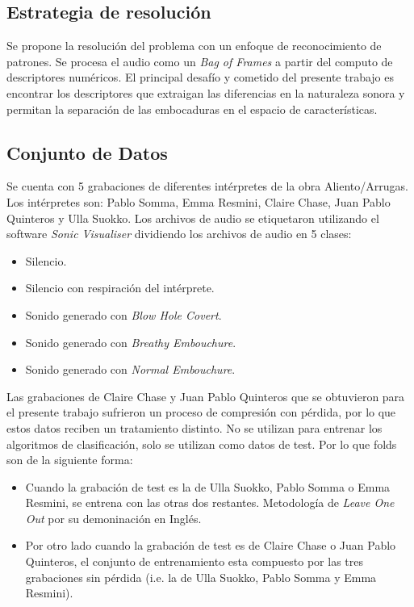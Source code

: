 \documentclass{article}
\begin{document}
\subsection{Estrategia de resolución}

Se propone la resolución del problema con un enfoque de reconocimiento de patrones. Se procesa el audio como un \textit{Bag of Frames} a partir del computo de descriptores numéricos. El principal desafío y cometido del presente trabajo es encontrar los descriptores que extraigan las diferencias en la naturaleza sonora y permitan la separación de las embocaduras en el espacio de características. 
\medskip

\subsection{Conjunto de Datos}
\label{datos}
Se cuenta con 5 grabaciones de diferentes intérpretes de la obra Aliento/Arrugas. Los intérpretes son: Pablo Somma, Emma Resmini, Claire Chase, Juan Pablo Quinteros y Ulla Suokko. Los archivos de audio se etiquetaron utilizando el software \textit{Sonic Visualiser} \citep{cannam2010sonic} dividiendo los archivos de audio en 5 clases:

\begin{itemize} 
  \item Silencio.
  \item Silencio con respiración del intérprete. 
  \item Sonido generado con \textit{Blow Hole Covert}.
  \item Sonido generado con \textit{Breathy Embouchure}.
  \item Sonido generado con \textit{Normal Embouchure}.
\end{itemize}

Las grabaciones de Claire Chase y Juan Pablo Quinteros que se obtuvieron para el presente trabajo sufrieron un proceso de compresión con pérdida, por lo que estos datos reciben un tratamiento distinto. No se utilizan para entrenar los algoritmos de clasificación, solo se utilizan como datos de test. Por lo que folds son de la siguiente forma: 



\begin{itemize} 
  \item Cuando la grabación de test es la de Ulla Suokko, Pablo Somma o Emma Resmini, se entrena con las otras dos restantes. Metodología de \textit{Leave One Out} por su demoninación en Inglés.
  \item Por otro lado cuando la grabación de test es de Claire Chase o Juan Pablo Quinteros, el conjunto de entrenamiento esta compuesto por las tres grabaciones sin pérdida (i.e. la de Ulla Suokko, Pablo Somma y Emma Resmini).
\end{itemize}
\end{document}

